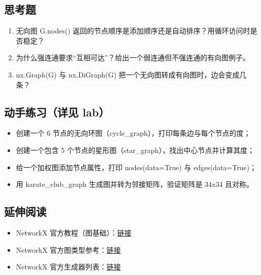 \subsection{思考题}\label{ux601dux8003ux9898-19}

\begin{enumerate}
\def\labelenumi{\arabic{enumi}.}
\tightlist
\item
  无向图 G.nodes()
  返回的节点顺序是添加顺序还是自动排序？用循环访问时是否稳定？
\item
  为什么强连通要求``互相可达''？给出一个弱连通但不强连通的有向图例子。
\item
  nx.Graph(G) 与 nx.DiGraph(G) 把一个无向图转成有向图时，边会变成几条？
\end{enumerate}

\subsection{动手练习（详见
lab）}\label{ux52a8ux624bux7ec3ux4e60ux8be6ux89c1-lab-11}

\begin{itemize}
\tightlist
\item
  创建一个 6 节点的无向环图（cycle\_graph），打印每条边与每个节点的度；
\item
  创建一个包含 5 个节点的星形图（star\_graph），找出中心节点并计算其度；
\item
  给一个加权图添加节点属性，打印 nodes(data=True) 与 edges(data=True)；
\item
  用 karate\_club\_graph 生成图并转为邻接矩阵，验证矩阵是 34x34 且对称。
\end{itemize}

\subsection{延伸阅读}\label{ux5ef6ux4f38ux9605ux8bfb-26}

\begin{itemize}
\tightlist
\item
  NetworkX
  官方教程（图基础）：\href{https://networkx.org/documentation/stable/tutorial.html}{链接}
\item
  NetworkX
  官方图类型参考：\href{https://networkx.org/documentation/stable/reference/classes/index.html}{链接}
\item
  NetworkX
  官方生成器列表：\href{https://networkx.org/documentation/stable/reference/generators.html}{链接}
\end{itemize}

